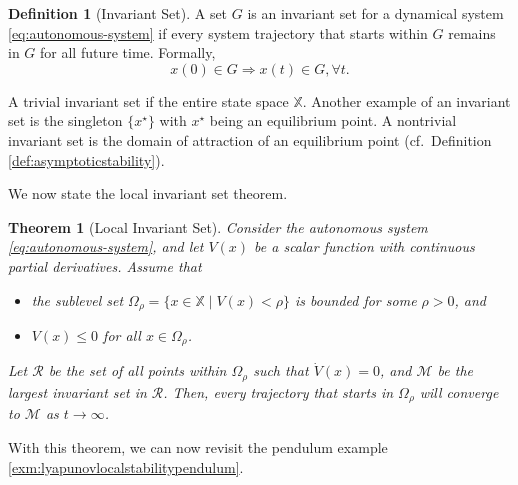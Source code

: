 \documentclass[
]{book}
\newtheorem{theorem}{Theorem}[chapter]
\theoremstyle{definition}
\newtheorem{definition}{Definition}[chapter]
\theoremstyle{definition}
\theoremstyle{definition}
\theoremstyle{definition}
\theoremstyle{remark}
\begin{document}
\begin{definition}[Invariant Set]
\protect\hypertarget{def:invariantset}{}\label{def:invariantset}A set \(G\) is an invariant set for a dynamical system \eqref{eq:autonomous-system} if every system trajectory that starts within \(G\) remains in \(G\) for all future time. Formally,
\[
x(0) \in G \Longrightarrow x(t) \in G,\forall t.
\]
\end{definition}

A trivial invariant set if the entire state space \(\mathbb{X}\). Another example of an invariant set is the singleton \(\{x^\star \}\) with \(x^\star\) being an equilibrium point. A nontrivial invariant set is the domain of attraction of an equilibrium point (cf.~Definition \ref{def:asymptoticstability}).

We now state the local invariant set theorem.

\begin{theorem}[Local Invariant Set]
\protect\hypertarget{thm:localinvariantsettheorm}{}\label{thm:localinvariantsettheorm}Consider the autonomous system \eqref{eq:autonomous-system}, and let \(V(x)\) be a scalar function with continuous partial derivatives. Assume that

\begin{itemize}
\item
  the sublevel set \(\Omega_{\rho} = \{ x \in \mathbb{X} \mid V(x) < \rho \}\) is bounded for some \(\rho > 0\), and
\item
  \(V(x) \leq 0\) for all \(x \in \Omega_{\rho}\).
\end{itemize}

Let \(\mathcal{R}\) be the set of all points within \(\Omega_{\rho}\) such that \(\dot{V}(x) = 0\), and \(\mathcal{M}\) be the largest invariant set in \(\mathcal{R}\). Then, every trajectory that starts in \(\Omega_{\rho}\) will converge to \(\mathcal{M}\) as \(t \rightarrow \infty\).
\end{theorem}

With this theorem, we can now revisit the pendulum example \ref{exm:lyapunovlocalstabilitypendulum}.
\end{document}
